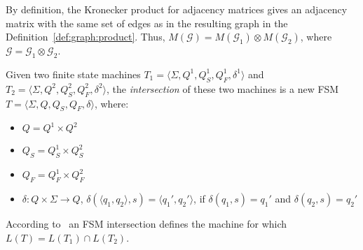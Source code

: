 By definition, the Kronecker product for adjacency matrices gives an
adjacency matrix with the same set of edges as in the resulting graph in the
Definition~\ref{def:graph:product}. Thus, $M(\mathcal{G}) = M(\mathcal{G}_1) \otimes
M(\mathcal{G}_2)$, where $\mathcal{G} = \mathcal{G}_1 \otimes \mathcal{G}_2$.

\begin{definition}
\label{def:fsm:intersection}
Given two finite state machines 
$T_1 = \langle \Sigma, Q^1, Q_S^1, Q_F^1, \delta^1 \rangle$ and \\
$T_2 = \langle \Sigma, Q^2, Q_S^2, Q_F^2, \delta^2 \rangle$, the \textit{intersection} of these two machines is a new FSM $T = \langle \Sigma, Q, Q_S, Q_F, \delta \rangle$, where:
\begin{itemize}
    \item $Q = Q^1 \times Q^2$
    \item $Q_S = Q_S^1 \times Q_S^2$
    \item $Q_F = Q_F^1 \times Q_F^2$
    \item $\delta: Q \times \Sigma \to Q$,
    $\delta (\langle q_1, q_2 \rangle, s) = \langle q_1', q_2' \rangle$, if $\delta(q_1,s)=q_1'$ and $\delta(q_2,s)=q_2'$
\end{itemize}
\end{definition}
According to~\cite{automata:theory:10.5555/1177300} an FSM intersection defines the machine for which $L(T) = L(T_1) \cap L(T_2)$.




